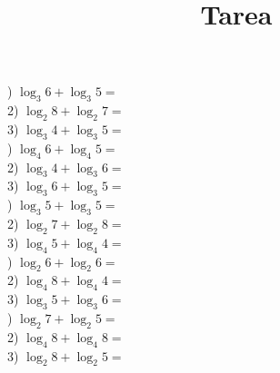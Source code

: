 \documentclass[a4paper,12pt]{article}
\title{Tarea}
\author{}
\date{}
\begin{document}
) $\log_3{6}+\log_3{5}=$\vspace{1cm}\\ 
2) $\log_2{8}+\log_2{7}=$\vspace{1cm}\\ 
3) $\log_3{4}+\log_3{5}=$\vspace{1cm}\\ 

 ) $\log_4{6}+\log_4{5}=$\vspace{1cm}\\ 
2) $\log_3{4}+\log_3{6}=$\vspace{1cm}\\ 
3) $\log_3{6}+\log_3{5}=$\vspace{1cm}\\ 

 ) $\log_3{5}+\log_3{5}=$\vspace{1cm}\\ 
2) $\log_2{7}+\log_2{8}=$\vspace{1cm}\\ 
3) $\log_4{5}+\log_4{4}=$\vspace{1cm}\\ 

 ) $\log_2{6}+\log_2{6}=$\vspace{1cm}\\ 
2) $\log_4{8}+\log_4{4}=$\vspace{1cm}\\ 
3) $\log_3{5}+\log_3{6}=$\vspace{1cm}\\ 

 ) $\log_2{7}+\log_2{5}=$\vspace{1cm}\\ 
2) $\log_4{8}+\log_4{8}=$\vspace{1cm}\\ 
3) $\log_2{8}+\log_2{5}=$\vspace{1cm}\\ 

 \pagebreak 
\end{document}
